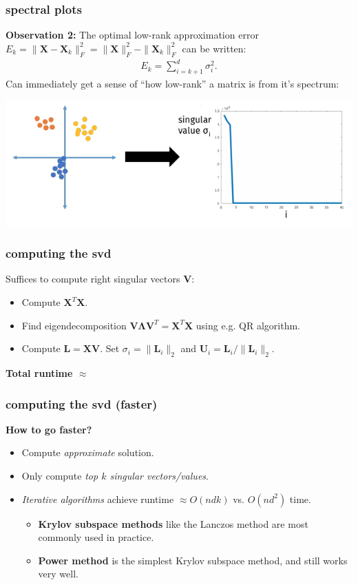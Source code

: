 \documentclass[compress]{beamer}
\newcommand{\bs}[1]{\boldsymbol{#1}}
\newcommand{\bv}[1]{\mathbf{#1}}
\begin{document}
\begin{frame}[t]
	\frametitle{spectral plots}
	\textbf{Observation 2:}
	The optimal low-rank approximation error $E_k = \|\bv{X} - \bv{X}_k\|_F^2 = \|\bv{X}\|_F^2 - \|\bv{X}_k\|_F^2$ can be written:
	\begin{align*}
	E_k = \sum_{i=k+1}^d \sigma_i^2.
	\end{align*}
	Can immediately get a sense of ``how low-rank'' a matrix is from it's spectrum:
	\begin{center}
		\includegraphics[width=.8\textwidth]{cluster_spectrum.png}
	\end{center}
\end{frame}

\begin{frame}[t]
	\frametitle{computing the svd}
	Suffices to compute right singular vectors $\bv{V}$:
	\begin{itemize}
		\item Compute $\bv{X}^T\bv{X}$.
		\item Find eigendecomposition $\bv{V}\bs{\Lambda}\bv{V}^T = \bv{X}^T\bv{X}$ using e.g. QR algorithm.
		\item Compute $\bv{L} = \bv{X}\bv{V}$. Set $\sigma_i = \|\bv{L}_i\|_2$ and $\bv{U}_i = \bv{L}_i/\|\bv{L}_i\|_2$.
	\end{itemize}

\vspace{2em}
\begin{center}
	\hspace{-3em} \alert{\textbf{Total runtime $\approx$}}
\end{center}
\end{frame}

\begin{frame}[t]
	\frametitle{computing the svd (faster)}
	\textbf{How to go faster?}
	\begin{itemize}
		\item Compute \emph{approximate} solution.
		\item Only compute \emph{top $k$ singular vectors/values}.
		\item \emph{Iterative algorithms} achieve runtime $\approx O(ndk)$ vs. $O(nd^2)$ time.  
		\begin{itemize}
			\item \textbf{Krylov subspace methods} like the Lanczos method are most commonly used in practice. 
			\item \textbf{Power method} is the simplest Krylov subspace method, and still works very well. 
		\end{itemize}
	\end{itemize}
\end{frame}
\end{document}

